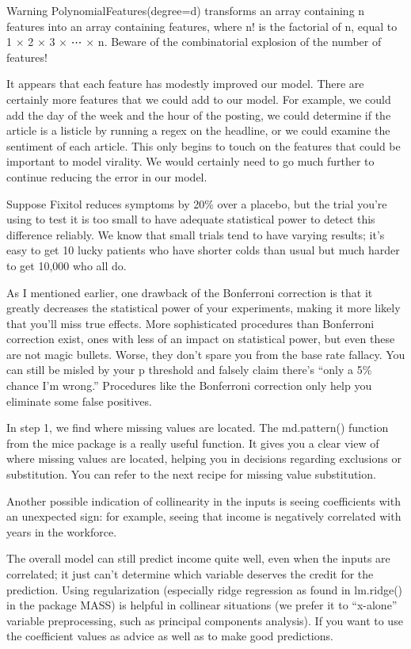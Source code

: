 \documentclass[]{book}
\begin{document}
Warning PolynomialFeatures(degree=d) transforms an array containing n features into an array containing features, where n! is the factorial of n, equal to 1 × 2 × 3 × ⋯ × n. Beware of the combinatorial explosion of the number of features!

It appears that each feature has modestly improved our model. There are certainly more features that we could add to our model. For example, we could add the day of the week and the hour of the posting, we could determine if the article is a listicle by running a regex on the headline, or we could examine the sentiment of each article. This only begins to touch on the features that could be important to model virality. We would certainly need to go much further to continue reducing the error in our model.

Suppose Fixitol reduces symptoms by 20\% over a placebo, but the trial you're using to test it is too small to have adequate statistical power to detect this difference reliably. We know that small trials tend to have varying results; it's easy to get 10 lucky patients who have shorter colds than usual but much harder to get 10,000 who all do.

As I mentioned earlier, one drawback of the Bonferroni correction is that it greatly decreases the statistical power of your experiments, making it more likely that you'll miss true effects. More sophisticated procedures than Bonferroni correction exist, ones with less of an impact on statistical power, but even these are not magic bullets. Worse, they don't spare you from the base rate fallacy. You can still be misled by your p threshold and falsely claim there's ``only a 5\% chance I'm wrong.'' Procedures like the Bonferroni correction only help you eliminate some false positives.

In step 1, we find where missing values are located. The md.pattern() function from the mice package is a really useful function. It gives you a clear view of where missing values are located, helping you in decisions regarding exclusions or substitution. You can refer to the next recipe for missing value substitution.

Another possible indication of collinearity in the inputs is seeing coefficients with an unexpected sign: for example, seeing that income is negatively correlated with years in the workforce.

The overall model can still predict income quite well, even when the inputs are correlated; it just can't determine which variable deserves the credit for the prediction. Using regularization (especially ridge regression as found in lm.ridge() in the package MASS) is helpful in collinear situations (we prefer it to ``x-alone'' variable preprocessing, such as principal components analysis). If you want to use the coefficient values as advice as well as to make good predictions.
\end{document}
